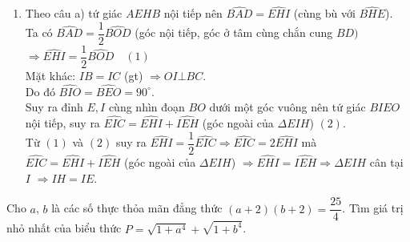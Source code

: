 \begin{ex}
{\begin{enumerate}
			\item Theo câu a) tứ giác $AEHB$ nội tiếp nên $\widehat{BAD}=\widehat{EHI}$ (cùng bù với $\widehat{BHE}$).\\
			Ta có $\widehat{BAD}=\dfrac{1}{2} \widehat{BOD}$ (góc nội tiếp, góc ở tâm cùng chắn cung $BD)$
			$\Rightarrow \widehat{EHI}=\dfrac{1}{2} \widehat{BOD}  \quad (1)$\\
			Mặt khác: $IB=IC$ (gt)
			$\Rightarrow OI\bot BC$.\\
			Do đó $\widehat{BIO}=\widehat{BEO}=90^{\circ}$.\\
			Suy ra đỉnh $E,I$ cùng nhìn đoạn $BO$ dưới một góc vuông nên tứ giác $BIEO$ nội tiếp, suy ra $ \widehat{EIC}=\widehat{EHI}+\widehat{IEH}$ (góc ngoài của $\Delta EIH$) \quad $(2)$.\\			
			Từ $\left(1\right)$ và $\left(2\right)$ suy ra $\widehat{EHI}=\dfrac{1}{2} \widehat{EIC}\Rightarrow \widehat{EIC}=2\widehat{EHI}$ mà $\widehat{EIC}=\widehat{EHI}+\widehat{IEH}$ (góc ngoài của $\Delta EIH$) $\Rightarrow \widehat{EHI}=\widehat{IEH}\Rightarrow \Delta EIH$ cân tại $I$ $\Rightarrow IH=IE$.
		\end{enumerate}
	}
\end{ex}

\begin{ex}%
	Cho $a$, $b$ là các số thực thỏa mãn đẳng thức $\left(a+2\right)\left(b+2\right)=\dfrac{25}{4} $. Tìm giá trị nhỏ nhất của biểu thức $P=\sqrt{1+a^4} +\sqrt{1+b^4}$. 
\end{ex}

